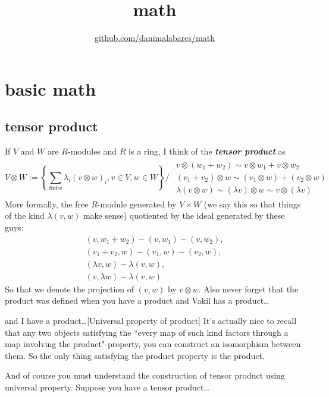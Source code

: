 
\usepackage{textgreek}
\title{math}
\author{\href{https://github.com/danimalabares/math}{github.com/danimalabares/math}}


\maketitle
{}
\tableofcontents
\clearpage
\chapter{basic math}

\section{tensor product}

\begin{defn}\leavevmode
If \(V\) and \(W\) are \(R\)-modules and \(R\) is a ring, I think of the \textit{\textbf{tensor product}} as
\[V\otimes W:=\left\{\sum_{\text{finite} }\lambda_i (v \otimes w)_i, v \in V, w \in W \right\} \Big/ \substack{\begin{array}{c}v \otimes (w_1+w_2)\sim v\otimes w_1+ v\otimes w_2\\ (v_1+v_2) \otimes w \sim(v_1 \otimes w)+(v_2 \otimes w)\\ \lambda(v \otimes w)\sim(\lambda v) \otimes w \sim  v \otimes(\lambda v)\end{array}}\]
More formally, the free \(R\)-module generated by \(V \times W\) (we say this so that things of the kind \(\lambda(v,w)\) make sense) quotiented by the ideal generated by these guys:
\begin{gather*}(v,w_1+w_2)-(v,w_1)-(v,w_2),\\ (v_1+v_2,w)-(v_1,w)-(v_2,w),\\ (\lambda v,w)-\lambda(v,w),\\(v,\lambda w)-\lambda(v,w)\end{gather*}
So that we denote the projection of \((v,w)\) by \(v \otimes w\). Also never forget that the product was defined when you have a product and Vakil has a product…
\begin{thing7}{and I have a product…}[Universal property of product]\leavevmode
It's actually nice to recall that any two objects satisfying the ``every map of such kind factors through a map involving the product"-property, you can construct an isomorphism between them. So the only thing satisfying the product property is the product.
\end{thing7}
\end{defn}
And of course you must understand the construction of tensor product using universal property. Suppose you have a tensor product…

